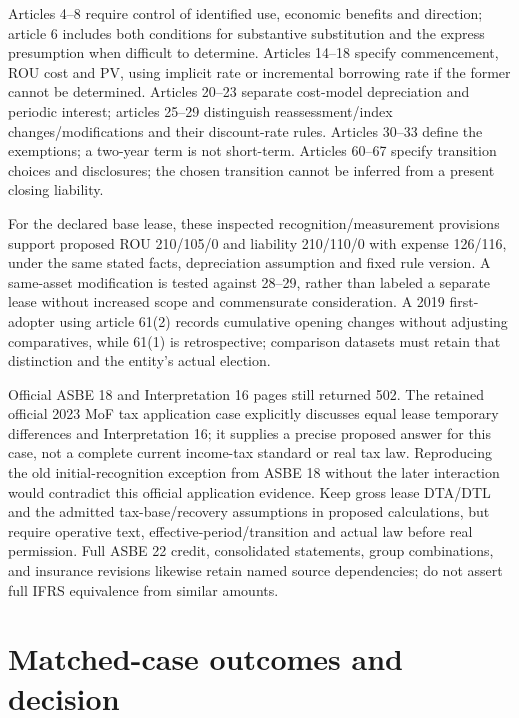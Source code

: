Articles 4--8 require control of identified use, economic benefits and direction; article 6 includes both conditions for substantive substitution and the express presumption when difficult to determine. Articles 14--18 specify commencement, ROU cost and PV, using implicit rate or incremental borrowing rate if the former cannot be determined. Articles 20--23 separate cost-model depreciation and periodic interest; articles 25--29 distinguish reassessment/index changes/modifications and their discount-rate rules. Articles 30--33 define the exemptions; a two-year term is not short-term. Articles 60--67 specify transition choices and disclosures; the chosen transition cannot be inferred from a present closing liability.

For the declared base lease, these inspected recognition/measurement provisions support proposed ROU 210/105/0 and liability 210/110/0 with expense 126/116, under the same stated facts, depreciation assumption and fixed rule version. A same-asset modification is tested against 28--29, rather than labeled a separate lease without increased scope and commensurate consideration. A 2019 first-adopter using article 61(2) records cumulative opening changes without adjusting comparatives, while 61(1) is retrospective; comparison datasets must retain that distinction and the entity's actual election.

Official ASBE 18 and Interpretation 16 pages still returned 502. The retained official 2023 MoF tax application case explicitly discusses equal lease temporary differences and Interpretation 16; it supplies a precise proposed answer for this case, not a complete current income-tax standard or real tax law. Reproducing the old initial-recognition exception from ASBE 18 without the later interaction would contradict this official application evidence. Keep gross lease DTA/DTL and the admitted tax-base/recovery assumptions in proposed calculations, but require operative text, effective-period/transition and actual law before real permission. Full ASBE 22 credit, consolidated statements, group combinations, and insurance revisions likewise retain named source dependencies; do not assert full IFRS equivalence from similar amounts.

\hypertarget{matched-case-outcomes-and-decision}{%
\section{Matched-case outcomes and decision}\label{method-standards-methods-matched-case-outcomes-and-decision}}

